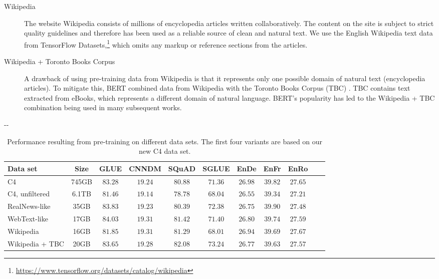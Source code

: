 \documentclass[twoside,11pt]{article}
\newlength{\offsetpage}
\newenvironment{widepage}{\begin{adjustwidth}{-\offsetpage}{-\offsetpage}
    \addtolength{\textwidth}{2\offsetpage}}
{\end{adjustwidth}}
\newcommand{\bsl}{\makebox[0pt][r]{\raisebox{0.05em}{$\bigstar\,$}}}
\def\*#1{\mathbf{#1}}
\begin{document}
\begin{description}
\item[Wikipedia] The website Wikipedia consists of millions of encyclopedia articles written collaboratively.
The content on the site is subject to strict quality guidelines and therefore has been used as a reliable source of clean and natural text.
We use the English Wikipedia text data from TensorFlow Datasets,\footnote{\url{https://www.tensorflow.org/datasets/catalog/wikipedia}} which omits any markup or reference sections from the articles.

\item[Wikipedia + Toronto Books Corpus] A drawback of using pre-training data from Wikipedia is that it represents only one possible domain of natural text (encyclopedia articles).
To mitigate this, BERT \citep{devlin2018bert} combined data from Wikipedia with the Toronto Books Corpus (TBC) \citep{zhu2015aligning}.
TBC contains text extracted from eBooks, which represents a different domain of natural language.
BERT's popularity has led to the Wikipedia + TBC combination being used in many subsequent works.

\end{description}

\begin{table}
\footnotesize
\begin{widepage}
\centering
\begin{tabular}{l c c c c c c c c c c}
\toprule
    Data set         & Size  & GLUE        & CNNDM       & SQuAD       & SGLUE       & EnDe        & EnFr        & EnRo    \\
\midrule
    \bsl C4         & 745GB & $83.28$     & $\*{19.24}$ & $80.88$     & $71.36$     & $\*{26.98}$ & $\*{39.82}$ & $\*{27.65}$ \\
    C4, unfiltered  & 6.1TB & $81.46$     & $19.14$     & $78.78$     & $68.04$     & $26.55$     & $39.34$     & $27.21$ \\
    RealNews-like   & 35GB  & $\*{83.83}$ & $\*{19.23}$ & $80.39$     & $72.38$     & $\*{26.75}$ & $\*{39.90}$ & $\*{27.48}$ \\
    WebText-like    & 17GB  & $\*{84.03}$ & $\*{19.31}$ & $\*{81.42}$ & $71.40$     & $\*{26.80}$ & $\*{39.74}$ & $\*{27.59}$ \\
    Wikipedia       & 16GB  & $81.85$     & $\*{19.31}$ & $81.29$     & $68.01$     & $\*{26.94}$ & $39.69$     & $\*{27.67}$ \\
    Wikipedia + TBC & 20GB  & $83.65$     & $\*{19.28}$ & $\*{82.08}$ & $\*{73.24}$ & $\*{26.77}$ & $39.63$     & $\*{27.57}$ \\
\bottomrule
\end{tabular}
\end{widepage}
\caption{
Performance resulting from pre-training on different data sets.
The first four variants are based on our new C4 data set.
}
\label{tab:datasets}
\end{table}
\end{document}
